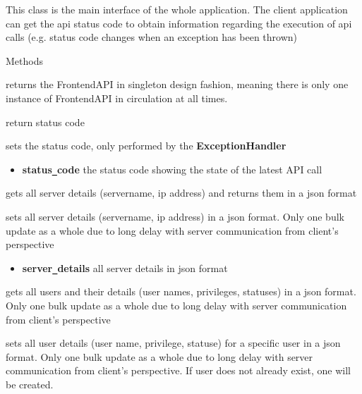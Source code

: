 This class is the main interface of the whole application. The client application
can get the api status code to obtain information regarding the execution of api calls (e.g. status code
changes when an exception has been thrown)

\begin{methodenv}{Methods}

 returns the FrontendAPI in singleton design fashion, meaning 
there is only one instance of FrontendAPI in circulation at all times.

 return status code  

sets the status code, only performed by the \textbf{ExceptionHandler}
\begin{itemize}
        \item \textbf{status\texttt{\_}code}
        the status code showing the state of the latest API call
\end{itemize}

gets all server details (servername, ip address) 
and returns them in a json format 

sets all server details (servername, ip address) in
a json format. Only one bulk update as a whole
due to long delay with server communication from client's perspective
\begin{itemize}
        \item \textbf{server\texttt{\_}details}
        all server details in json format
\end{itemize}

gets all users and their details (user names, privileges, statuses) in a json format. Only one bulk update as a whole
due to long delay with server communication from client's perspective


sets all user details (user name, privilege, statuse) for a specific user in a json format. Only one bulk update as a whole
due to long delay with server communication from client's perspective. If user does not already exist, one will be created.


\end{methodenv}
